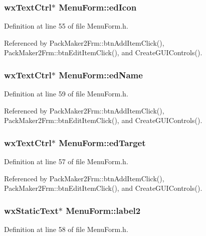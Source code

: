\subsubsection{\setlength{\rightskip}{0pt plus 5cm}wx\-Text\-Ctrl$\ast$ {\bf Menu\-Form::ed\-Icon}}\label{class_menu_form_fac02644964027bcaf0c48d6ade69cdb}




Definition at line 55 of file Menu\-Form.h.

Referenced by Pack\-Maker2Frm::btn\-Add\-Item\-Click(), Pack\-Maker2Frm::btn\-Edit\-Item\-Click(), and Create\-GUIControls().
\subsubsection{\setlength{\rightskip}{0pt plus 5cm}wx\-Text\-Ctrl$\ast$ {\bf Menu\-Form::ed\-Name}}\label{class_menu_form_3a0247bb478b03bc572934a607b9b185}




Definition at line 59 of file Menu\-Form.h.

Referenced by Pack\-Maker2Frm::btn\-Add\-Item\-Click(), Pack\-Maker2Frm::btn\-Edit\-Item\-Click(), and Create\-GUIControls().
\subsubsection{\setlength{\rightskip}{0pt plus 5cm}wx\-Text\-Ctrl$\ast$ {\bf Menu\-Form::ed\-Target}}\label{class_menu_form_78bfe1520bf5d3ad0ed11cfc317beaf3}




Definition at line 57 of file Menu\-Form.h.

Referenced by Pack\-Maker2Frm::btn\-Add\-Item\-Click(), Pack\-Maker2Frm::btn\-Edit\-Item\-Click(), and Create\-GUIControls().
\subsubsection{\setlength{\rightskip}{0pt plus 5cm}wx\-Static\-Text$\ast$ {\bf Menu\-Form::label2}}\label{class_menu_form_70fbfaff92ed403ae808715fc96d5a95}




Definition at line 58 of file Menu\-Form.h.

